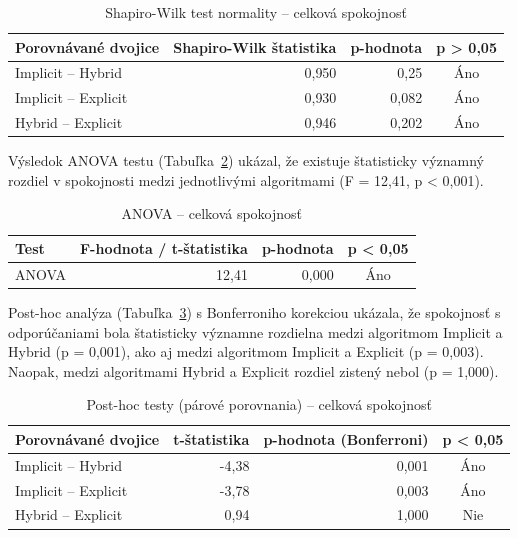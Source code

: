 \begin{table}[h!]
  \caption{Shapiro-Wilk test normality – celková spokojnosť}
  \label{tab:shw1}
  \centering
  \begin{tabular}{@{}lrrc@{}}
    \toprule
    \textbf{Porovnávané dvojice} & \textbf{Shapiro-Wilk štatistika} & \textbf{p-hodnota} & \textbf{p > 0,05} \\
    \midrule
    Implicit -- Hybrid & 0{,}950 & 0{,}25 & Áno \\
    Implicit -- Explicit & 0{,}930 & 0{,}082 & Áno \\
    Hybrid -- Explicit & 0{,}946 & 0{,}202 & Áno \\
    \bottomrule
  \end{tabular}
\end{table}

Výsledok ANOVA testu (Tabuľka~\ref{tab:anova_hod}) ukázal, že existuje štatisticky významný rozdiel v spokojnosti medzi jednotlivými algoritmami (F = 12{,}41, p < 0{,}001).

\begin{table}[h!]
  \caption{ANOVA – celková spokojnosť}
  \label{tab:anova_hod}
  \centering
  \begin{tabular}{@{}lrrc@{}}
    \toprule
    \textbf{Test} & \textbf{F-hodnota / t-štatistika} & \textbf{p-hodnota} & \textbf{p < 0{,}05} \\
    \midrule
    ANOVA & 12{,}41 & 0{,}000 & Áno \\
    \bottomrule
  \end{tabular}
\end{table}

Post-hoc analýza (Tabuľka~\ref{tab:posthoc_hod}) s Bonferroniho korekciou ukázala, že spokojnosť s odporúčaniami bola štatisticky významne rozdielna medzi algoritmom Implicit a Hybrid (p = 0{,}001), ako aj medzi algoritmom Implicit a Explicit (p = 0{,}003). Naopak, medzi algoritmami Hybrid a Explicit rozdiel zistený nebol (p = 1{,}000).

\begin{table}[h!]
  \caption{Post-hoc testy (párové porovnania) – celková spokojnosť}
  \label{tab:posthoc_hod}
  \centering
  \begin{tabular}{@{}lrrc@{}}
    \toprule
    \textbf{Porovnávané dvojice} & \textbf{t-štatistika} & \textbf{p-hodnota (Bonferroni)} & \textbf{p < 0{,}05} \\
    \midrule
    Implicit -- Hybrid & -4{,}38 & 0{,}001 & Áno \\
    Implicit -- Explicit & -3{,}78 & 0{,}003 & Áno \\
    Hybrid -- Explicit & 0{,}94 & 1{,}000 & Nie \\
    \bottomrule
  \end{tabular}
\end{table}

